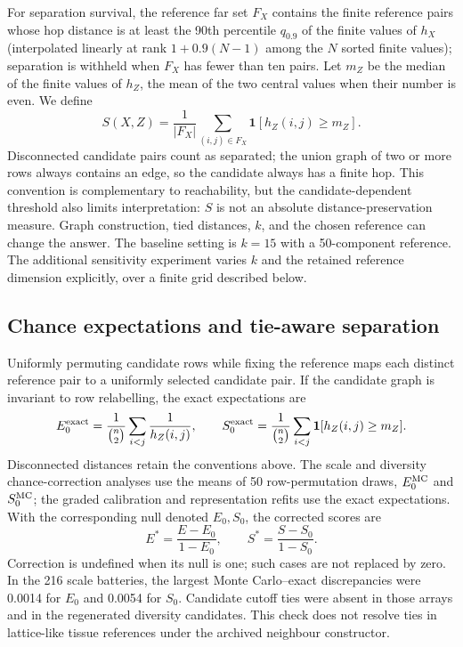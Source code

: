 \documentclass[11pt]{article}
\begin{document}
For separation survival, the reference far set $F_X$ contains the finite reference pairs whose hop distance is at least the 90th percentile $q_{0.9}$ of the finite values of $h_X$ (interpolated linearly at rank $1+0.9(N-1)$ among the $N$ sorted finite values); separation is withheld when $F_X$ has fewer than ten pairs. Let $m_Z$ be the median of the finite values of $h_Z$, the mean of the two central values when their number is even. We define
\begin{equation}
 S(X,Z)=\frac{1}{|F_X|}\sum_{(i,j)\in F_X}\mathbf 1[h_Z(i,j)\geq m_Z].
\end{equation}
Disconnected candidate pairs count as separated; the union graph of two or more rows always contains an edge, so the candidate always has a finite hop. This convention is complementary to reachability, but the candidate-dependent threshold also limits interpretation: $S$ is not an absolute distance-preservation measure. Graph construction, tied distances, $k$, and the chosen reference can change the answer. The baseline setting is $k=15$ with a 50-component reference. The additional sensitivity experiment varies $k$ and the retained reference dimension explicitly, over a finite grid described below.



\subsection{Chance expectations and tie-aware separation}

Uniformly permuting candidate rows while fixing the reference maps each distinct reference pair to a uniformly selected candidate pair. If the candidate graph is invariant to row relabelling, the exact expectations are
\begin{equation}
 E_0^{\rm exact}=\frac{1}{\binom n2}\sum_{i<j}\frac{1}{h_Z(i,j)},\qquad
 S_0^{\rm exact}=\frac{1}{\binom n2}\sum_{i<j}\mathbf 1[h_Z(i,j)\geq m_Z].
\end{equation}
Disconnected distances retain the conventions above. The scale and diversity chance-correction analyses use the means of 50 row-permutation draws, $E_0^{\rm MC}$ and $S_0^{\rm MC}$; the graded calibration and representation refits use the exact expectations. With the corresponding null denoted $E_0,S_0$, the corrected scores are
\begin{equation}
 E^*=\frac{E-E_0}{1-E_0},\qquad S^*=\frac{S-S_0}{1-S_0}.\label{eq:corrected}
\end{equation}
Correction is undefined when its null is one; such cases are not replaced by zero. In the 216 scale batteries, the largest Monte Carlo--exact discrepancies were 0.0014 for $E_0$ and 0.0054 for $S_0$. Candidate cutoff ties were absent in those arrays and in the regenerated diversity candidates. This check does not resolve ties in lattice-like tissue references under the archived neighbour constructor.
\end{document}
